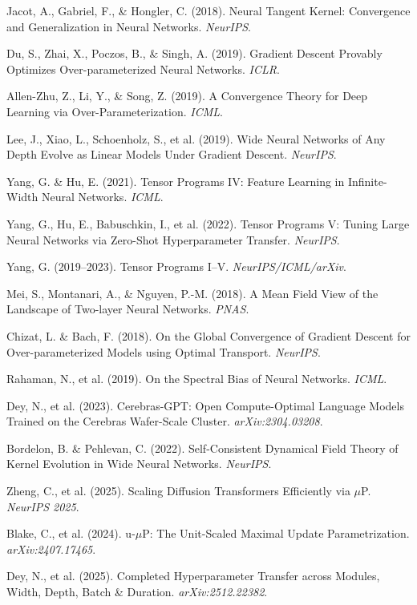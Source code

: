 \documentclass[11pt,a4paper]{article}
\begin{document}
\begin{enumerate}[leftmargin=*,label={[\arabic*]}]
\item Jacot, A., Gabriel, F., \& Hongler, C. (2018). Neural Tangent Kernel: Convergence and Generalization in Neural Networks. \textit{NeurIPS}.
\item Du, S., Zhai, X., Poczos, B., \& Singh, A. (2019). Gradient Descent Provably Optimizes Over-parameterized Neural Networks. \textit{ICLR}.
\item Allen-Zhu, Z., Li, Y., \& Song, Z. (2019). A Convergence Theory for Deep Learning via Over-Parameterization. \textit{ICML}.
\item Lee, J., Xiao, L., Schoenholz, S., et al. (2019). Wide Neural Networks of Any Depth Evolve as Linear Models Under Gradient Descent. \textit{NeurIPS}.
\item Yang, G. \& Hu, E. (2021). Tensor Programs IV: Feature Learning in Infinite-Width Neural Networks. \textit{ICML}.
\item Yang, G., Hu, E., Babuschkin, I., et al. (2022). Tensor Programs V: Tuning Large Neural Networks via Zero-Shot Hyperparameter Transfer. \textit{NeurIPS}.
\item Yang, G. (2019--2023). Tensor Programs I--V. \textit{NeurIPS/ICML/arXiv}.
\item Mei, S., Montanari, A., \& Nguyen, P.-M. (2018). A Mean Field View of the Landscape of Two-layer Neural Networks. \textit{PNAS}.
\item Chizat, L. \& Bach, F. (2018). On the Global Convergence of Gradient Descent for Over-parameterized Models using Optimal Transport. \textit{NeurIPS}.
\item Rahaman, N., et al. (2019). On the Spectral Bias of Neural Networks. \textit{ICML}.
\item Dey, N., et al. (2023). Cerebras-GPT: Open Compute-Optimal Language Models Trained on the Cerebras Wafer-Scale Cluster. \textit{arXiv:2304.03208}.
\item Bordelon, B. \& Pehlevan, C. (2022). Self-Consistent Dynamical Field Theory of Kernel Evolution in Wide Neural Networks. \textit{NeurIPS}.
\item Zheng, C., et al. (2025). Scaling Diffusion Transformers Efficiently via $\mu$P. \textit{NeurIPS 2025}.
\item Blake, C., et al. (2024). u-$\mu$P: The Unit-Scaled Maximal Update Parametrization. \textit{arXiv:2407.17465}.
\item Dey, N., et al. (2025). Completed Hyperparameter Transfer across Modules, Width, Depth, Batch \& Duration. \textit{arXiv:2512.22382}.
\end{enumerate}
\end{document}
